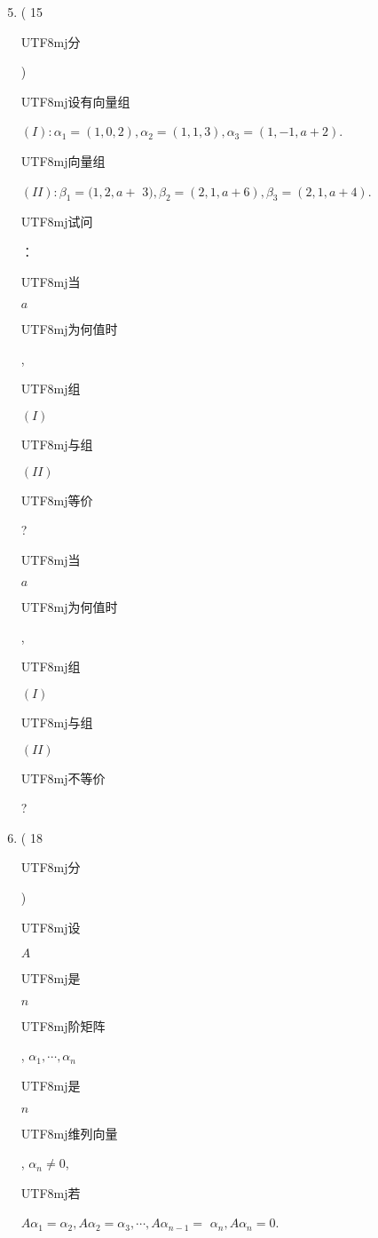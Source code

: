 \documentclass[10pt]{article}
\begin{document}
\begin{enumerate}
  \setcounter{enumi}{4}
  \item ( 15 \begin{CJK}{UTF8}{mj}分\end{CJK}) \begin{CJK}{UTF8}{mj}设有向量组\end{CJK} $(I): \alpha_{1}=(1,0,2), \alpha_{2}=(1,1,3), \alpha_{3}=(1,-1, a+2)$. \begin{CJK}{UTF8}{mj}向量组\end{CJK} $(I I): \beta_{1}=(1,2, a+$ $3), \beta_{2}=(2,1, a+6), \beta_{3}=(2,1, a+4)$. \begin{CJK}{UTF8}{mj}试问\end{CJK}：\begin{CJK}{UTF8}{mj}当\end{CJK} $a$ \begin{CJK}{UTF8}{mj}为何值时\end{CJK}, \begin{CJK}{UTF8}{mj}组\end{CJK} $(I)$ \begin{CJK}{UTF8}{mj}与组\end{CJK} $(I I)$ \begin{CJK}{UTF8}{mj}等价\end{CJK}? \begin{CJK}{UTF8}{mj}当\end{CJK} $a$ \begin{CJK}{UTF8}{mj}为何值时\end{CJK}, \begin{CJK}{UTF8}{mj}组\end{CJK} $(I)$ \begin{CJK}{UTF8}{mj}与组\end{CJK} $(I I)$ \begin{CJK}{UTF8}{mj}不等价\end{CJK}?

  \item ( 18 \begin{CJK}{UTF8}{mj}分\end{CJK}) \begin{CJK}{UTF8}{mj}设\end{CJK} $A$ \begin{CJK}{UTF8}{mj}是\end{CJK} $n$ \begin{CJK}{UTF8}{mj}阶矩阵\end{CJK}, $\alpha_{1}, \cdots, \alpha_{n}$ \begin{CJK}{UTF8}{mj}是\end{CJK} $n$ \begin{CJK}{UTF8}{mj}维列向量\end{CJK}, $\alpha_{n} \neq 0$, \begin{CJK}{UTF8}{mj}若\end{CJK} $A \alpha_{1}=\alpha_{2}, A \alpha_{2}=\alpha_{3}, \cdots, A \alpha_{n-1}=$ $\alpha_{n}, A \alpha_{n}=0 .$

\end{enumerate}
\end{document}
